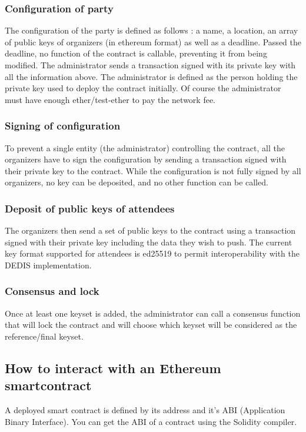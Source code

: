 \documentclass[11pt, a4paper, twoside, openright]{book} %
\begin{document}
\subsubsection{Configuration of party}
The configuration of the party is defined as follows : a name, a location, an array of public keys of organizers (in ethereum format) as well as a deadline. Passed the deadline, no function of the contract is callable, preventing it from being modified. The administrator sends a transaction signed with its private key with all the information above. The administrator is defined as the person holding the private key used to deploy the contract initially. Of course the administrator must have enough ether/test-ether to pay the network fee.
\subsubsection{Signing of configuration}
To prevent a single entity (the administrator) controlling the contract, all the organizers have to sign the configuration by sending a transaction signed with their private key to the contract. While the configuration is not fully signed by all organizers, no key can be deposited, and no other function can be called.
\subsubsection{Deposit of public keys of attendees}
The organizers then send a set of public keys to the contract using a transaction signed with their private key including the data they wish to push. The current key format supported for attendees is ed25519 to permit interoperability with the DEDIS implementation.
\subsubsection{Consensus and lock}
Once at least one keyset is added, the administrator can call a consensus function that will lock the contract and will choose which keyset will be considered as the reference/final keyset.


\subsection{How to interact with an Ethereum smartcontract}
A deployed smart contract is defined by its address and it's ABI (Application Binary Interface). You can get the ABI of a contract using the Solidity compiler.
\end{document}
